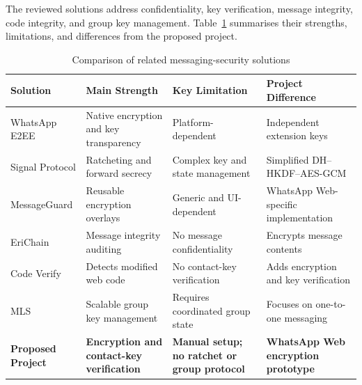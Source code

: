 \documentclass[11pt]{article}
\begin{document}
The reviewed solutions address confidentiality, key verification, message
integrity, code integrity, and group key management. Table~\ref{tab:related-work}
summarises their strengths, limitations, and differences from the proposed project.

\begin{table}[htbp]
    \centering
    \caption{Comparison of related messaging-security solutions}
    \label{tab:related-work}
    \small
    \renewcommand{\arraystretch}{1.35}
    \setlength{\tabcolsep}{3pt}

    \begin{tabularx}{0.9\linewidth}{
        @{}
        >{\raggedright\arraybackslash}p{1.8cm}
        >{\raggedright\arraybackslash}X
        >{\raggedright\arraybackslash}X
        >{\raggedright\arraybackslash}X
        @{}
    }
        \toprule
        \textbf{Solution} &
        \textbf{Main Strength} &
        \textbf{Key Limitation} &
        \textbf{Project Difference} \\
        \midrule
        WhatsApp E2EE &
        Native encryption and key transparency &
        Platform-dependent &
        Independent extension keys \\

        Signal Protocol &
        Ratcheting and forward secrecy &
        Complex key and state management &
        Simplified DH--HKDF--AES-GCM \\

        MessageGuard &
        Reusable encryption overlays &
        Generic and UI-dependent &
        WhatsApp Web-specific implementation \\

        EriChain &
        Message integrity auditing &
        No message confidentiality &
        Encrypts message contents \\

        Code Verify &
        Detects modified web code &
        No contact-key verification &
        Adds encryption and key verification \\

        MLS &
        Scalable group key management &
        Requires coordinated group state &
        Focuses on one-to-one messaging \\

        \textbf{Proposed Project} &
        \textbf{Encryption and contact-key verification} &
        \textbf{Manual setup; no ratchet or group protocol} &
        \textbf{WhatsApp Web encryption prototype} \\
        \bottomrule
    \end{tabularx}
\end{table}
\end{document}
